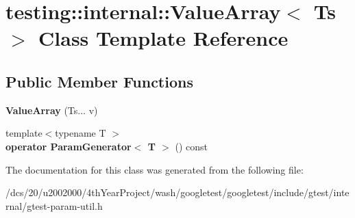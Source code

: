 \hypertarget{classtesting_1_1internal_1_1ValueArray}{}\section{testing\+:\+:internal\+:\+:Value\+Array$<$ Ts $>$ Class Template Reference}
\label{classtesting_1_1internal_1_1ValueArray}
\subsection*{Public Member Functions}
\begin{DoxyCompactItemize}
\item 
\mbox{\label{classtesting_1_1internal_1_1ValueArray_acd7cd6a969a7e95152eac1787c42c9ed}} 
{\bfseries Value\+Array} (Ts... v)
\item 
\mbox{\label{classtesting_1_1internal_1_1ValueArray_a019560f10debdce5f47bb18c0e5261b5}} 
{\footnotesize template$<$typename T $>$ }\\{\bfseries operator Param\+Generator$<$ T $>$} () const
\end{DoxyCompactItemize}


The documentation for this class was generated from the following file\+:\begin{DoxyCompactItemize}
\item 
/dcs/20/u2002000/4th\+Year\+Project/wash/googletest/googletest/include/gtest/internal/gtest-\/param-\/util.\+h\end{DoxyCompactItemize}
